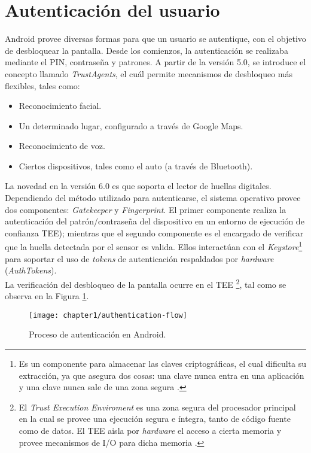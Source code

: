 \section{Autenticación del usuario}
Android provee diversas formas para que un usuario se autentique, con el objetivo de desbloquear la pantalla. Desde los comienzos, la autenticación se realizaba mediante el PIN, contraseña y patrones. A partir de la versión 5.0, se introduce el concepto llamado \textit{TrustAgents}, el cuál permite mecanismos de desbloqueo más flexibles, tales como:
\begin{itemize}
	\item Reconocimiento facial.
	\item Un determinado lugar, configurado a través de Google Maps.
	\item Reconocimiento de voz.
	\item Ciertos dispositivos, tales como el auto (a través de Bluetooth).
\end{itemize}
La novedad en la versión 6.0 es que soporta el lector de huellas digitales.\\
Dependiendo del método utilizado para autenticarse, el sistema operativo provee dos componentes: \textit{Gatekeeper} y \textit{Fingerprint}. El primer componente realiza la autenticación del patrón/contraseña del dispositivo en un entorno de ejecución de confianza TEE); mientras que el segundo componente es el encargado de verificar que la huella detectada por el sensor es valida. Ellos interactúan con el \textit{Keystore}\footnote{Es un componente para almacenar las claves criptográficas, el cual dificulta su extracción, ya que asegura dos cosas: una clave nunca entra en una aplicación y una clave nunca sale de una zona segura \cite{dakss}.} para soportar el uso de \textit{tokens} de autenticación respaldados por \textit{hardware} (\textit{AuthTokens}).\\
La verificación del desbloqueo de la pantalla ocurre en el TEE \footnote{El \textit{Trust Execution Enviroment} es una zona segura del procesador principal en la cual se provee una ejecución segura e íntegra, tanto de código fuente como de datos. El TEE aisla por \textit{hardware} el acceso a cierta memoria y provee mecanismos de I/O para dicha memoria \cite{tee2011}.}, tal como se observa en la Figura \ref{fig:ch01:authentication-flow}.
\begin{figure}[htbp]
	\begin{center}
		\texttt{[image: chapter1/authentication-flow]}
		\caption{Proceso de autenticación en Android\cite{aossec}.}
		\label{fig:ch01:authentication-flow}
	\end{center}
\end{figure}
